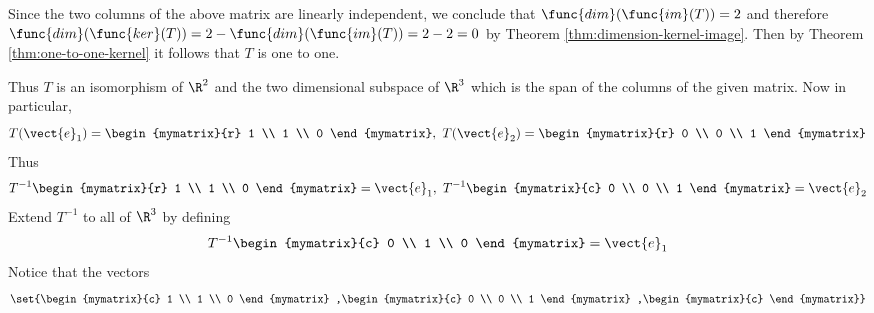 \begin{solution}
Since the two columns of the above matrix are linearly independent, we conclude that $\func{dim}(\func{im}(T)) = 2$ and therefore $\func{dim}(\func{ker}(T)) = 2 - \func{dim}(\func{im}(T)) = 2-2 = 0$ by Theorem \ref{thm:dimension-kernel-image}. Then by Theorem \ref{thm:one-to-one-kernel} it follows that $T$ is one to one. 

Thus $T$ is an isomorphism of $\R^{2}$ and the two dimensional subspace of $\R^{3}$ which is the
span of the columns of the given matrix. Now in particular, 
\begin{equation*}
T(\vect{e}_{1})=\begin{mymatrix}{r}
1 \\ 
1 \\ 
0
\end{mymatrix} ,\ T(\vect{e}_{2})=\begin{mymatrix}{r}
0 \\ 
0 \\ 
1
\end{mymatrix}
\end{equation*}
Thus 
\begin{equation*}
T^{-1}\begin{mymatrix}{r}
1 \\ 
1 \\ 
0
\end{mymatrix} =\vect{e}_{1},\ T^{-1}\begin{mymatrix}{c}
0 \\ 
0 \\ 
1
\end{mymatrix} =\vect{e}_{2}
\end{equation*}
Extend $T^{-1}$ to all of $\R^{3}$ by defining 
\begin{equation*}
T^{-1}\begin{mymatrix}{c}
0 \\ 
1 \\ 
0
\end{mymatrix} =\vect{e}_{1}
\end{equation*}
Notice that the vectors
\begin{equation*}
\set{\begin{mymatrix}{c}
1 \\ 
1 \\ 
0
\end{mymatrix} ,\begin{mymatrix}{c}
0 \\ 
0 \\ 
1
\end{mymatrix} ,\begin{mymatrix}{c}

\end{mymatrix}}
\end{equation*}
\end{solution}
